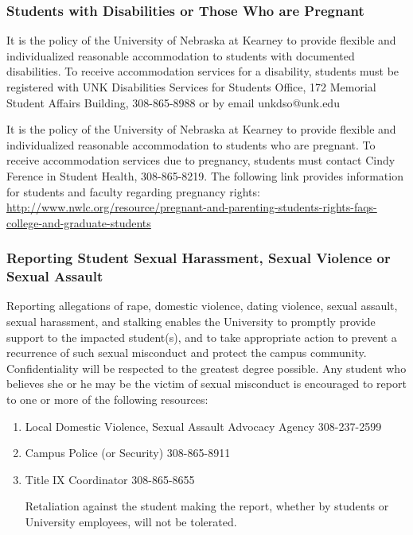 \documentclass[12pt,fullpage]{article}
\newcounter{ex}\setcounter{ex}{0}
\begin{document}
\subsubsection*{Students with Disabilities or Those Who are Pregnant}

It is the policy of the University of Nebraska at Kearney to provide flexible and individualized reasonable accommodation to students with documented disabilities. To receive accommodation services for a disability, students must be registered with UNK Disabilities Services for Students Office, 172 Memorial Student Affairs Building, 308-865-8988 or by email unkdso@unk.edu


It is the policy of the University of Nebraska at Kearney to provide flexible and individualized reasonable accommodation to students who are pregnant. To receive accommodation services due to pregnancy, students must contact Cindy Ference in Student Health, 308-865-8219. The following link provides information for students and faculty regarding pregnancy rights:  \small \url{ http://www.nwlc.org/resource/pregnant-and-parenting-students-rights-faqs-college-and-graduate-students} \normalsize 

\subsubsection*{Reporting Student Sexual Harassment, Sexual Violence or Sexual Assault}


Reporting allegations of rape, domestic violence, dating violence, sexual assault, sexual harassment, and stalking enables the University to promptly provide support to the impacted student(s), and to take appropriate action to prevent a recurrence of such sexual misconduct and protect the campus community. Confidentiality will be respected to the greatest degree possible. Any student who believes she or he may be the victim of sexual misconduct is encouraged to report to one or more of the following resources:

\begin{enumerate}

\item Local Domestic Violence, Sexual Assault Advocacy Agency 308-237-2599

\item Campus Police (or Security) 308-865-8911

\item Title IX Coordinator 308-865-8655

Retaliation against the student making the report, whether by students or University employees, will not be tolerated.

\end{enumerate}
\end{document}
